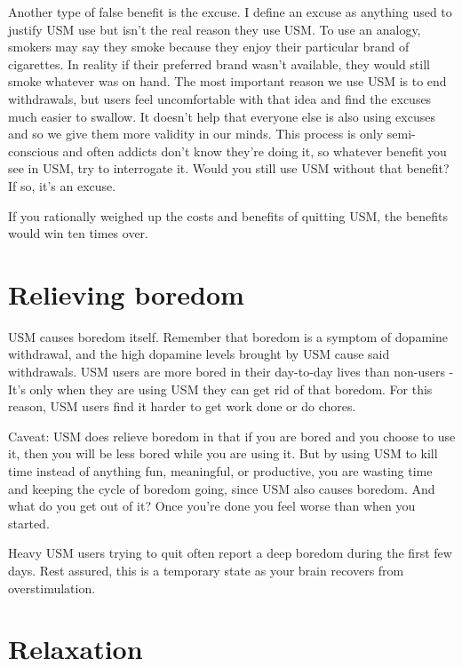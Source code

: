 \documentclass[
  openany]{book}
\newenvironment{rmdnote}{
\color{blue}
\begin{framed}}{\end{framed}}
\begin{document}
Another type of false benefit is the excuse. I define an excuse as anything used to justify USM use but isn't the real reason they use USM. To use an analogy, smokers may say they smoke because they enjoy their particular brand of cigarettes. In reality if their preferred brand wasn't available, they would still smoke whatever was on hand. The most important reason we use USM is to end withdrawals, but users feel uncomfortable with that idea and find the excuses much easier to swallow. It doesn't help that everyone else is also using excuses and so we give them more validity in our minds. This process is only semi-conscious and often addicts don't know they're doing it, so whatever benefit you see in USM, try to interrogate it. Would you still use USM without that benefit? If so, it's an excuse.

\begin{rmdnote}
If you rationally weighed up the costs and benefits of quitting USM, the benefits would win ten times over.

\end{rmdnote}

\section{Relieving boredom}\label{relieving-boredom}

USM causes boredom itself. Remember that boredom is a symptom of dopamine withdrawal, and the high dopamine levels brought by USM cause said withdrawals. USM users are more bored in their day-to-day lives than non-users - It's only when they are using USM they can get rid of that boredom. For this reason, USM users find it harder to get work done or do chores.

Caveat: USM does relieve boredom in that if you are bored and you choose to use it, then you will be less bored while you are using it. But by using USM to kill time instead of anything fun, meaningful, or productive, you are wasting time and keeping the cycle of boredom going, since USM also causes boredom. And what do you get out of it? Once you're done you feel worse than when you started.

Heavy USM users trying to quit often report a deep boredom during the first few days. Rest assured, this is a temporary state as your brain recovers from overstimulation.

\section{Relaxation}\label{relaxation}
\end{document}
